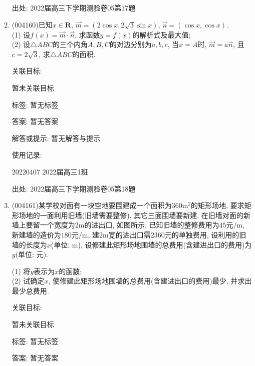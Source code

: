 \documentclass[10pt,a4paper]{article}
\begin{document}
\begin{enumerate}[1.]
出处: 2022届高三下学期测验卷05第17题
\item { (004160)}已知$x\in \mathbf{R}$, $\overrightarrow m=(2\cos x,2\sqrt 3\sin x)$, $\overrightarrow n=(\cos x,\cos x)$.\\
(1) 设$f(x)=\overrightarrow m\cdot \overrightarrow n$, 求函数$y=f(x)$的解析式及最大值;\\
(2) 设$\triangle ABC$的三个内角$A,B,C$的对边分别为$a,b,c$, 当$x=A$时, $\overrightarrow m=a\overrightarrow n$, 且$c=2\sqrt 3$, 求$\triangle ABC$的面积.


关联目标:

暂未关联目标



标签: 暂无标签

答案: 暂无答案

解答或提示: 暂无解答与提示

使用记录:

20220407	2022届高三1班		


出处: 2022届高三下学期测验卷05第18题
\item { (004161)}某学校对面有一块空地要围建成一个面积为$360\text{m}^2$的矩形场地, 要求矩形场地的一面利用旧墙(旧墙需要整修), 其它三面围墙要新建, 在旧墙对面的新墙上要留一个宽度为$2\text{m}$的进出口, 如图所示. 已知旧墙的整修费用为$45\text{元/m}$, 新建墙的造价为$180\text{元/m}$, 建$2\text{m}$宽的进出口需$2360$元的单独费用, 设利用的旧墙的长度为$x$(单位: $\text{m}$), 设修建此矩形场地围墙的总费用(含建进出口的费用)为$y$(单位: 元).\\
\begin{center}
\end{center}
(1) 将$y$表示为$x$的函数;\\
(2) 试确定$x$, 使修建此矩形场地围墙的总费用(含建进出口的费用)最少, 并求出最少总费用.


关联目标:

暂未关联目标



标签: 暂无标签

答案: 暂无答案


\end{enumerate}
\end{document}
